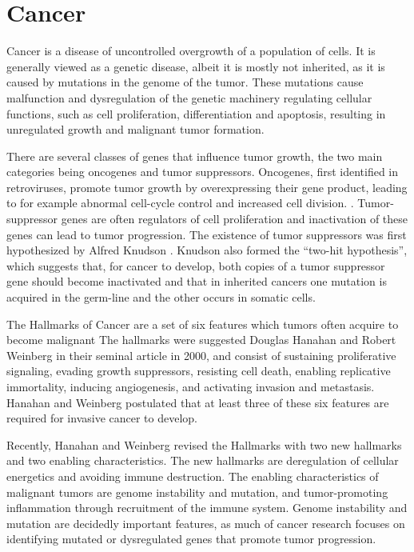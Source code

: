 
\section{Cancer}\label{cancer}

Cancer is a disease of uncontrolled overgrowth of a population of cells. It is
generally viewed as a genetic disease, albeit it is mostly not inherited, as it is
caused by  mutations in the genome of the tumor. These mutations cause malfunction
and dysregulation of the genetic machinery regulating cellular functions, such
as cell proliferation, differentiation and apoptosis, resulting in
unregulated growth and malignant tumor formation.

There are several classes of genes that influence tumor growth, the two main
categories being oncogenes and tumor suppressors. Oncogenes, first
identified in retroviruses,
promote tumor growth by overexpressing their gene product, leading to for
example abnormal cell-cycle control and increased cell division.
\citep{Varmus1988}. Tumor-suppressor genes are often regulators of cell
proliferation and
inactivation of these genes can lead to tumor progression. The existence of
tumor suppressors was first hypothesized by Alfred Knudson \citep{Knudson1971}.
Knudson also formed the “two-hit hypothesis”, which
suggests that, for cancer to develop, both copies of
a tumor suppressor gene should become inactivated and that in inherited
cancers one mutation is acquired in the germ-line and the other occurs in
somatic cells.

The Hallmarks of Cancer are a set of
six features which tumors often acquire to become malignant
The hallmarks were suggested Douglas Hanahan and Robert Weinberg \citep{Hanahan2000} in
their seminal article in 2000, and consist of
sustaining proliferative signaling, evading growth suppressors, resisting cell
death, enabling replicative immortality, inducing angiogenesis, and activating
invasion and metastasis. Hanahan and Weinberg postulated that at least three
of these six features are required for invasive cancer to develop.

Recently, Hanahan and Weinberg \citep{Hanahan2011} revised the Hallmarks with two new
hallmarks and two enabling characteristics. The new
hallmarks are deregulation of cellular energetics and avoiding immune
destruction. The enabling characteristics of malignant tumors are genome
instability and mutation, and tumor-promoting inflammation through recruitment
of the immune system. Genome instability and mutation are decidedly important
features, as much of cancer research focuses on identifying mutated or
dysregulated genes that promote tumor progression.




